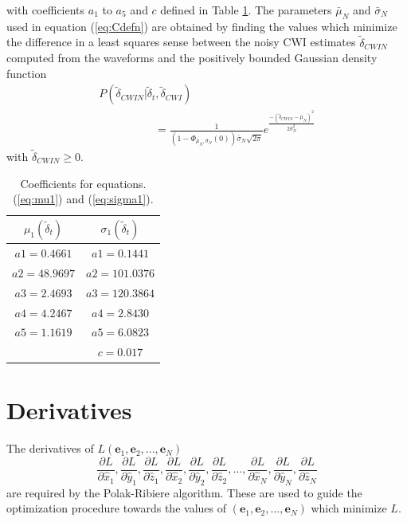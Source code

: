 \documentclass[extra, onecolumn, doublespacing]{gji}
\begin{document}
with coefficients $a_1$ to $a_5$ and $c$ defined in Table
\ref{tab-const4-mu1-sigma1}. The parameters $\bar{\mu}_N$ and
$\bar{\sigma}_N$ used in equation (\ref{eq:Cdefn}) are obtained by
finding the values which minimize the difference in a least squares
sense between the noisy CWI estimates $\widetilde{\delta}_{CWIN}$
computed from the waveforms and the positively bounded Gaussian
density function
\begin{equation}
\label{eq-likelihood-noisydata-pdf-orig}
\begin{array}{l}
P(\widetilde{\delta}_{CWIN}|\widetilde{\delta}_t,\widetilde{\delta}_{CWI}) \\
\hspace{5em} = \frac{1}{\left(1-\Phi_{\bar{\mu}_N,\bar{\sigma}_N}(0)\right)\bar{\sigma}_N\sqrt{2\pi}}
e^{  \frac{-(\widetilde{\delta}_{CWIN}-\bar{\mu}_N)^2}{2\bar{\sigma}_N^2}  }
\end{array}
\end{equation}
with $\widetilde{\delta}_{CWIN} \geq 0$.


\begin{table}
\caption{Coefficients for equations. (\ref{eq:mu1}) and
(\ref{eq:sigma1}).} \label{tab-const4-mu1-sigma1}
\begin{tabular}{|c|c|}
\hline
$\mu_1(\widetilde{\delta}_t)$ & $\sigma_1(\widetilde{\delta}_t)$ \\
\hline
$a1 = 0.4661$ & $a1 = 0.1441$\\
$a2 = 48.9697$ & $a2 = 101.0376$\\
$a3 = 2.4693$ & $a3 = 120.3864$\\
$a4 = 4.2467$ & $a4 = 2.8430$\\
$a5 = 1.1619$ & $a5 = 6.0823$ \\
     & $c = 0.017$ \\
\hline
\end{tabular}
\end{table}


\section{Derivatives}
\label{sec-Appendix-derivatives_ofL}

The derivatives of $L(\mathbf{e}_1,\mathbf{e}_2,...,\mathbf{e}_N)$
\begin{equation}
\frac{\partial L}{\partial \hat{x}_1},
\frac{\partial L}{\partial \hat{y}_1},
 \frac{\partial L}{\partial \hat{z}_1},
\frac{\partial L}{\partial \hat{x}_2},
\frac{\partial L}{\partial \hat{y}_2},
\frac{\partial L}{\partial \hat{z}_2},
...,
\frac{\partial L}{\partial \hat{x}_N},
\frac{\partial L}{\partial \hat{y}_N},
\frac{\partial L}{\partial \hat{z}_N}
\end{equation}
are required by the Polak-Ribiere algorithm. These are used to guide
the optimization procedure towards the values of
$(\mathbf{e}_1,\mathbf{e}_2,...,\mathbf{e}_N)$ which minimize $L$.
\end{document}
